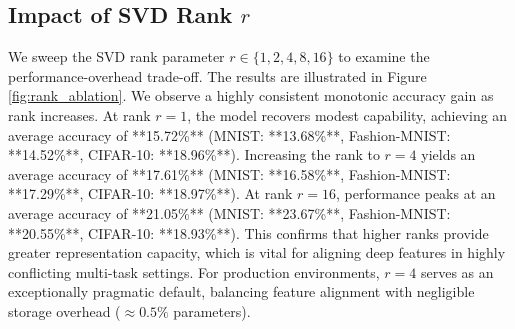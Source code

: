 \documentclass{article}
\theoremstyle{plain}
\theoremstyle{definition}
\theoremstyle{remark}
\begin{document}
\subsection{Impact of SVD Rank $r$}
We sweep the SVD rank parameter $r \in \{1, 2, 4, 8, 16\}$ to examine the performance-overhead trade-off. The results are illustrated in Figure \ref{fig:rank_ablation}.
We observe a highly consistent monotonic accuracy gain as rank increases. At rank $r=1$, the model recovers modest capability, achieving an average accuracy of **15.72\%** (MNIST: **13.68\%**, Fashion-MNIST: **14.52\%**, CIFAR-10: **18.96\%**). Increasing the rank to $r=4$ yields an average accuracy of **17.61\%** (MNIST: **16.58\%**, Fashion-MNIST: **17.29\%**, CIFAR-10: **18.97\%**). At rank $r=16$, performance peaks at an average accuracy of **21.05\%** (MNIST: **23.67\%**, Fashion-MNIST: **20.55\%**, CIFAR-10: **18.93\%**).
This confirms that higher ranks provide greater representation capacity, which is vital for aligning deep features in highly conflicting multi-task settings. For production environments, $r=4$ serves as an exceptionally pragmatic default, balancing feature alignment with negligible storage overhead ($\approx 0.5\%$ parameters).
\end{document}
